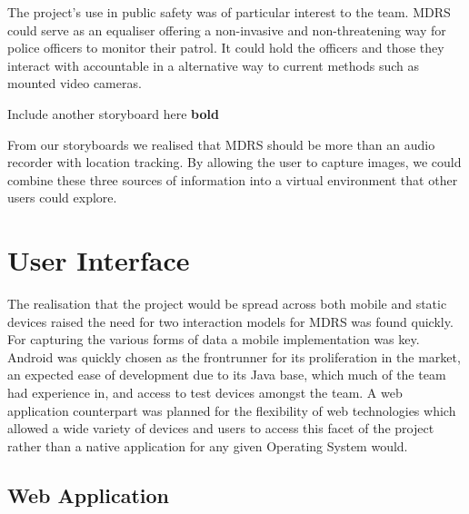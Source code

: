\documentclass{l3proj}
\begin{document}
The project's use in public safety was of particular interest to the team. MDRS could serve as an equaliser offering a non-invasive and non-threatening way for police officers to monitor their patrol. It could hold the officers and those they interact with accountable in a alternative way to current methods such as mounted video cameras.

Include another storyboard here {\bf bold}

From our storyboards we realised that MDRS should be more than an audio recorder with location tracking. By allowing the user to capture images, we could combine these three sources of information into a virtual environment that other users could explore.

\section{User Interface} The realisation that the project would be spread across
both mobile and static devices raised the need for two interaction models for
MDRS was found quickly. For capturing the various forms of data a mobile
implementation was key. Android was quickly chosen as the frontrunner for its
proliferation in the market, an expected ease of development due to its Java
base, which much of the team had experience in, and access to test devices
amongst the team. A web application counterpart was planned for the flexibility
of web technologies which allowed a wide variety of devices and users to access
this facet of the project rather than a native application for any given
Operating System would.

\subsection{Web Application}  


\end{document}
